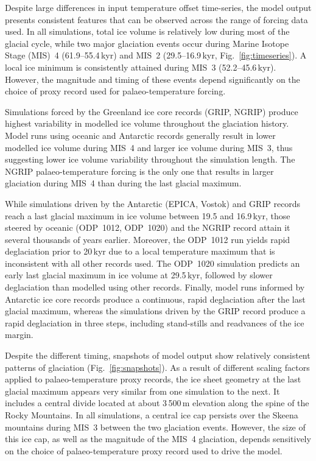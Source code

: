 \documentclass[tc, manuscript]{copernicus}
\begin{document}
Despite large differences in input temperature offset time-series, the model
output presents consistent features that can be observed across the range of
forcing data used. In all simulations, total ice volume is relatively low
during most of the glacial cycle, while two major glaciation events occur
during Marine Isotope Stage (MIS)~4 (61.9--55.4\,kyr) and MIS~2
(29.5--16.9\,kyr, Fig.~\ref{fig:timeseries}). A local ice minimum is
consistently attained during MIS~3 (52.2--45.6\,kyr). However, the
magnitude and timing of these events depend significantly on the choice of
proxy record used for palaeo-temperature forcing.

Simulations forced by the Greenland ice core records (GRIP, NGRIP) produce
highest variability in modelled ice volume throughout the glaciation history.
Model runs using oceanic and Antarctic records generally result in lower
modelled ice volume during MIS~4 and larger ice volume during MIS~3, thus
suggesting lower ice volume variability throughout the simulation length. The
NGRIP palaeo-temperature forcing is the only one that results in larger
glaciation during MIS~4 than during the last glacial maximum.

While simulations driven by the Antarctic (EPICA, Vostok) and GRIP records
reach a last glacial maximum in ice volume between 19.5 and 16.9\,kyr,
those steered by oceanic (ODP~1012, ODP~1020) and the NGRIP record attain it
several thousands of years earlier. Moreover, the ODP~1012 run yields rapid
deglaciation prior to 20\,kyr due to a local temperature maximum that is
inconsistent with all other records used. The ODP~1020 simulation predicts an
early last glacial maximum in ice volume at 29.5\,kyr, followed by
slower deglaciation than modelled using other records. Finally, model runs
informed by Antarctic ice core records produce a continuous, rapid deglaciation
after the last glacial maximum, whereas the simulations driven by the GRIP
record produce a rapid deglaciation in three steps, including stand-stills and
readvances of the ice margin.

Despite the different timing, snapshots of model output show relatively
consistent patterns of glaciation (Fig.~\ref{fig:snapshots}). As a result of
different scaling factors applied to palaeo-temperature proxy records, the
ice sheet geometry at the last glacial maximum appears very similar from one
simulation to the next. It includes a central divide located at about
3\,500\,m elevation along the spine of the Rocky Mountains. In all
simulations, a central ice cap persists over the Skeena mountains during MIS~3
between the two glaciation events. However, the size of this ice cap, as well
as the magnitude of the MIS~4 glaciation, depends sensitively on the choice of
palaeo-temperature proxy record used to drive the model.
\end{document}
